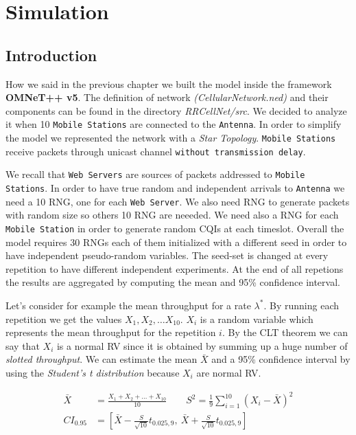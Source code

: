 \chapter{Simulation}

\section{Introduction}
How we said in the previous chapter we built the model inside the framework \textbf{OMNeT++ v5}. The definition of network \textit{(CellularNetwork.ned)} and their components can be found in the directory \textit{RRCellNet/src}. We decided to analyze it when 10 \texttt{Mobile Stations} are connected to the \texttt{Antenna}. In order to simplify the model we represented the network with a \textit{Star Topology}. \texttt{Mobile Stations} receive packets through unicast channel \texttt{without transmission delay}.

We recall that \texttt{Web Servers} are sources of packets addressed to \texttt{Mobile Stations}. In order to have true random and independent arrivals to \texttt{Antenna} we need a 10 RNG, one for each \texttt{Web Server}. We also need RNG to generate packets with random size so others 10 RNG are neeeded. We need also a RNG for each \texttt{Mobile Station} in order to generate random CQIs at each timeslot. Overall the model requires 30 RNGs each of them initialized with a different seed in order to have independent pseudo-random variables. The seed-set is changed at every repetition to have different independent experiments. At the end of all repetions the results are aggregated by computing the mean and 95\% confidence interval. 

Let's consider for example the mean throughput for a rate \(\lambda^{*}\). By running each repetition we get the values \(X_{1},X_{2},\ldots X_{10}\). \(X_{i}\) is a random variable which represents the mean throughput for the repetition \(i\). By the CLT theorem we can say that \(X_{i}\) is a normal RV since it is obtained by summing up a huge number of \textit{slotted throughput}. We can estimate the mean \(\bar{X}\) and a 95\% confidence interval by using the \textit{Student's t distribution} because \(X_{i}\) are normal RV. 

\begin{align}
	\bar{X} &= \frac{X_{1}+X_{2}+\ldots+X_{10}}{10} \qquad S^{2} = \frac{1}{9}\sum_{i=1}^{10}(X_{i} - \bar{X})^{2} \\
	CI_{0.95} &= \left[\bar{X} - \frac{S}{\sqrt{10}}t_{0.025,9}, \: \bar{X} + \frac{S}{\sqrt{10}}t_{0.025,9}\right]
\end{align}

